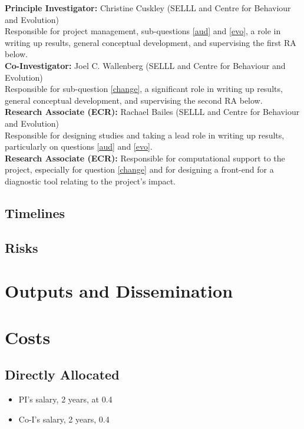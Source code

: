 \documentclass[11pt]{article}
\begin{document}
\noindent\textbf{Principle Investigator:} Christine Cuskley (SELLL and Centre for Behaviour and Evolution)\\
Responsible for project management, sub-questions \ref{aud} and \ref{evo}, a role in writing up results, general conceptual development, and supervising the first RA below.\\

\noindent\textbf{Co-Investigator:} Joel C. Wallenberg (SELLL and Centre for Behaviour and Evolution)\\
Responsible for sub-question \ref{change}, a significant role in writing up results, general conceptual development, and supervising the second RA below.\\

\noindent\textbf{Research Associate (ECR):} Rachael Bailes (SELLL and Centre for Behaviour and Evolution)\\
Responsible for designing studies and taking a lead role in writing up results, particularly on questions \ref{aud} and \ref{evo}. \\

\noindent\textbf{Research Associate (ECR):} Responsible for computational support to the project, especially for question \ref{change} and for designing a front-end for a diagnostic tool relating to the project's impact.


\subsection{Timelines}

\subsection{Risks}

\section{Outputs and Dissemination}

\section{Costs}

\subsection{Directly Allocated}

\begin{itemize}
	\item PI's salary, 2 years, at 0.4\\
	
	\item Co-I's salary, 2 years, 0.4\\
	
\end{itemize}
\end{document}
